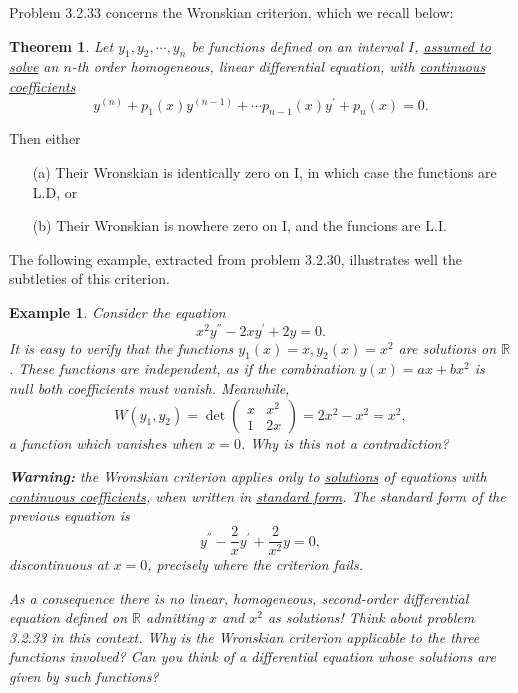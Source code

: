 \documentclass[11pt]{amsart}
\newtheorem{theorem}{Theorem}
\newtheorem{example}{Example}
\numberwithin{equation}{section}
\begin{document}
Problem 3.2.33 concerns the Wronskian criterion, which we recall below:

\begin{theorem}
Let $y_1,y_2,\cdots, y_n$ be functions defined on an interval $I$, \underline{assumed to solve} an $n$-th order homogeneous, linear differential equation, with \underline{continuous coefficients}
\begin{equation*}
y^{(n)}+p_1(x)y^{(n-1)} + \cdots p_{n-1}(x)y^{'}+p_n(x) = 0.
\end{equation*}
\end{theorem}

Then either

\begin{enumerate}
    \item[(a)] Their Wronskian is identically zero on I, in which case the functions are L.D, or
    \item[(b)] Their Wronskian is nowhere zero on I, and the funcions are L.I.
\end{enumerate}

The following example, extracted from problem 3.2.30, illustrates well the subtleties of this criterion.  

\begin{example}
Consider the equation
\begin{equation*}
    x^2y^{''}-2xy^{'}+2y=0.
\end{equation*}
It is easy to verify that the functions $y_1(x)=x, y_2(x)=x^2$ are solutions on $\mathbb{R}$. These functions are independent, as if the combination $y(x)=ax+bx^2$ is null both coefficients must vanish. 
Meanwhile,
\begin{equation*}
    W(y_1,y_2)=\det\left(
    \begin{matrix}
    x & x^2 \\
    1 & 2x
    \end{matrix}
    \right) = 2x^2-x^2=x^2,
\end{equation*}
a function which vanishes when $x=0$. Why is this not a contradiction?

{\bf Warning:} the Wronskian criterion applies only to \underline{solutions} of equations with \underline{continuous coefficients},  when written in \underline{standard form}. The standard form of the previous equation is 
\begin{equation*}
    y^{''}-\frac{2}{x}y^{'}+\frac{2}{x^2}y=0,
\end{equation*}
discontinuous at $x=0$,  precisely where the criterion fails.

As a consequence there is no linear, homogeneous, second-order differential equation defined on $\mathbb{R}$ admitting $x$ and $x^2$ as solutions! Think about problem 3.2.33 in this context. Why is the Wronskian criterion applicable to the three functions involved? Can you think of a differential equation whose solutions are given by such functions?
\end{example}
\end{document}
